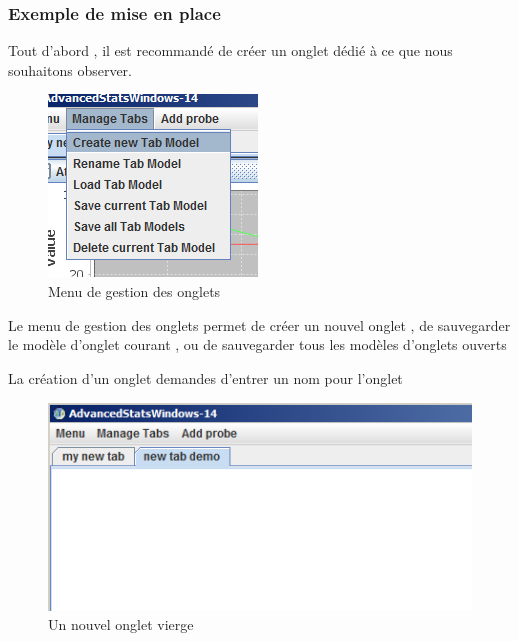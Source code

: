 \subsubsection{Exemple de mise en place}

Tout d'abord , il est recommandé de créer un onglet dédié à ce que nous souhaitons observer.

\begin{figure}[!ht]
\begin{center}
\includegraphics[scale=0.8]{DocumentationSimulation/images/ADVS_tabs.png}
\caption[observe]{Menu de gestion des onglets\\}
\label{observe7}
\end{center}
\end{figure} 

Le menu de gestion des onglets permet de créer un nouvel onglet , de sauvegarder le modèle d'onglet courant , ou de sauvegarder tous les modèles d'onglets ouverts

La création d'un onglet demandes d'entrer un nom pour l'onglet

\begin{figure}[!ht]
\begin{center}
\includegraphics[scale=0.8]{DocumentationSimulation/images/ADVS_newTab.png}
\caption[observe]{Un nouvel onglet vierge\\}
\label{observe8}
\end{center}
\end{figure} 

